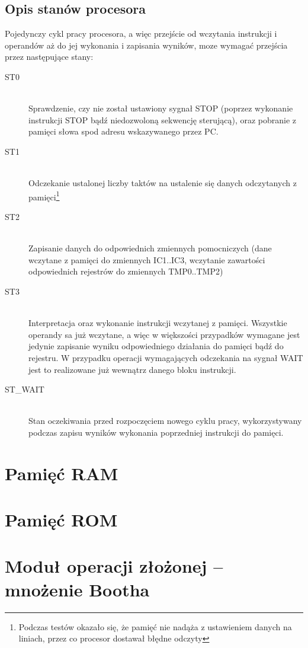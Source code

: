 \documentclass[a4paper,12pt]{report}
\begin{document}
\subsection{Opis stanów procesora}
Pojedynczy cykl pracy procesora, a więc przejście od wczytania instrukcji i operandów aż do jej wykonania i zapisania wyników, moze wymagać przejścia przez następujące stany:
\begin{description}
\item[ST0] \hfill \\
Sprawdzenie, czy nie został ustawiony sygnał STOP (poprzez wykonanie instrukcji STOP bądź niedozwoloną sekwencję sterującą), oraz pobranie z pamięci słowa spod adresu wskazywanego przez PC.
\item[ST1] \hfill \\
Odczekanie ustalonej liczby taktów na ustalenie się danych odczytanych z pamięci\footnote{Podczas testów okazało się, że pamięć nie nadąża z ustawieniem danych na liniach, przez co procesor dostawał błędne odczyty}
\item[ST2] \hfill \\
Zapisanie danych do odpowiednich zmiennych pomocniczych (dane wczytane z pamięci do zmiennych IC1..IC3, wczytanie zawartości odpowiednich rejestrów do zmiennych TMP0..TMP2)
\item[ST3] \hfill \\
Interpretacja oraz wykonanie instrukcji wczytanej z pamięci. Wszystkie operandy sa już wczytane, a więc w większości przypadków wymagane jest jedynie zapisanie wyniku odpowiedniego działania do pamięci bądź do rejestru. W przypadku operacji wymagających odczekania na sygnał WAIT jest to realizowane już wewnątrz danego bloku instrukcji.
\item[ST\_WAIT] \hfill \\
Stan oczekiwania przed rozpoczęciem nowego cyklu pracy, wykorzystywany podczas zapisu wyników wykonania poprzedniej instrukcji do pamięci.
\end{description}

\section{Pamięć RAM}


\section{Pamięć ROM}


\section{Moduł operacji złożonej -- mnożenie Bootha}
\end{document}
